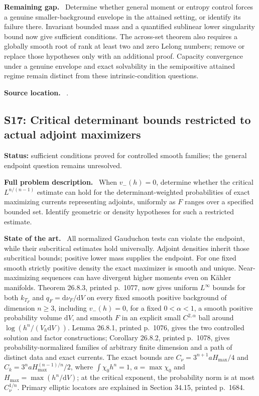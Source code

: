 \documentclass[11pt]{article}
\newcommand{\field}[1]{\par\medskip\noindent\textbf{#1.}\ }
\begin{document}
\field{Remaining gap} Determine whether general moment or entropy control forces a genuine smaller-background envelope in the attained setting, or identify its failure there. Invariant bounded mass and a quantified sublinear lower singularity bound now give sufficient conditions. The across-set theorem also requires a globally smooth root of rank at least two and zero Lelong numbers; remove or replace those hypotheses only with an additional proof. Capacity convergence under a genuine envelope and exact solvability in the semipositive attained regime remain distinct from these intrinsic-condition questions.
\field{Source location} .
\subsection{S17: Critical determinant bounds restricted to actual adjoint maximizers}
\label{S17}
\noindent\textbf{Status:} sufficient conditions proved for controlled smooth families; the general endpoint question remains unresolved.
\field{Full problem description} When $v_-(h)=0$, determine whether the critical $L^{n/(n-1)}$ estimate can hold for the determinant-weighted probabilities of exact maximizing currents representing adjoints, uniformly as $F$ ranges over a specified bounded set. Identify geometric or density hypotheses for such a restricted estimate.
\field{State of the art} All normalized Gauduchon tests can violate the endpoint, while their subcritical estimates hold universally. Adjoint densities inherit those subcritical bounds; positive lower mass supplies the endpoint. For one fixed smooth strictly positive density the exact maximizer is smooth and unique. Near-maximizing sequences can have divergent higher moments even on K\"ahler manifolds.
 Theorem 26.8.3, printed p.~1077, now gives uniform $L^\infty$ bounds for both $k_{T_F}$ and $q_F=\mathrm d\nu_F/\mathrm dV$ on every fixed smooth positive background of dimension $n\geq3$, including $v_-(h)=0$, for a fixed $0<\alpha<1$, a smooth positive probability volume $\mathrm dV$, and smooth $F$ in an explicit small $C^{2,\alpha}$ ball around $\log(h^n/(V_h\mathrm dV))$. Lemma 26.8.1, printed p.~1076, gives the two controlled solution and factor constructions; Corollary 26.8.2, printed p.~1078, gives probability-normalized families of arbitrary finite dimension and a path of distinct data and exact currents. The exact bounds are $C_\nu=3^{n+1}aH_{\max}/4$ and $C_k=3^naH_{\max}^{(n-1)/n}/2$, where $\int\chi_0h^n=1$, $a=\max\chi_0$ and $H_{\max}=\max(h^n/\mathrm dV)$; at the critical exponent, the probability norm is at most $C_\nu^{1/n}$. Primary elliptic locators are explained in Section 34.15, printed p.~1684.
\end{document}
